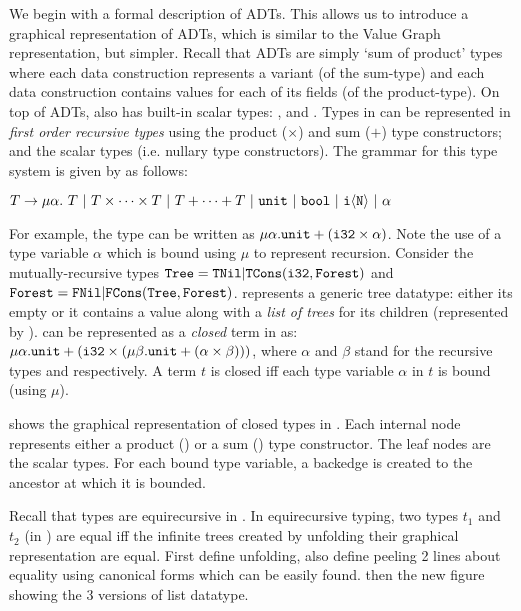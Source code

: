 We begin with a formal description of ADTs.
This allows us to introduce a graphical representation of ADTs, which is similar to the Value Graph representation, but simpler.
Recall that ADTs are simply `sum of product' types where each data construction represents a variant (of the sum-type) and
each data construction contains values for each of its fields (of the product-type).
On top of ADTs, \SpecL{} also has built-in scalar types: ,  and .
Types in \SpecL{} can be represented in {\em first order recursive types} using the product ($\times$) and sum ($+$) type
constructors; and the scalar types (i.e. nullary type constructors).
The grammar for this type system is given by \typegrammar{} as follows:

$T \rightarrow \mu \alpha. \ T \ |\ T \times \dots \times T \ |\  T + \dots + T \ |\  \type{unit} \ |\ \type{bool} \ |\  \type{i\langle N \rangle} \ |\ \alpha$

For example, the  type can be written as $\mu \alpha. {\tt unit} + ({\tt i32} \times \alpha)$.
Note the use of a type variable $\alpha$ which is bound using $\mu$ to represent recursion.
Consider the mutually-recursive types ${\tt Tree} = {\tt TNil} | {\tt TCons}({\tt i32}, {\tt Forest})$
and ${\tt Forest} = {\tt FNil} | {\tt FCons}({\tt Tree}, {\tt Forest})$.
 represents a generic  tree datatype: either its empty or it contains
a value along with a {\em list of trees} for its children (represented by ).
 can be represented as a {\em closed} term in \typegrammar{} as:
$\mu \alpha. {\tt unit} + ({\tt i32} \times (\mu \beta. {\tt unit + (\alpha \times \beta)}))$,
where $\alpha$ and $\beta$ stand for the recursive types  and  respectively.
A term $t$ is closed iff each type variable $\alpha$ in $t$ is bound (using $\mu$).



 shows the graphical representation of closed types in \typegrammar{}.
Each internal node represents either a product (\circled{$\times$}) or a sum (\circled{$+$}) type constructor.
The leaf nodes are the scalar types.
For each bound type variable, a backedge is created to the ancestor at which it is bounded.





Recall that types are equirecursive in \SpecL{}.
In equirecursive typing, two types $t_1$ and $t_2$ (in \typegrammar{}) are equal
iff the infinite trees created by unfolding their graphical representation are equal.
First define unfolding, also define peeling
2 lines about equality using canonical forms which can be easily found.
then the new figure showing the 3 versions of list datatype.

